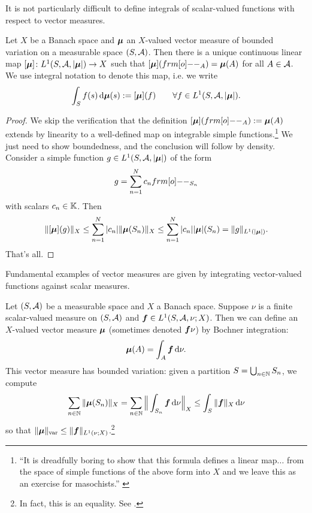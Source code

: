 It is not particularly difficult to define integrals of scalar-valued functions with respect to vector measures.

\begin{prop}
  Let $X$ be a Banach space and $\bm{\mu}$ an $X$-valued vector measure of bounded variation on a measurable space $(S,\mathcal{A})$.
  Then there is a unique continuous linear map $[\bm{\mu}] \colon L^1(S,\mathcal{A},|\bm{\mu}|) \rightarrow X$ such that $[\mb{\mu}](\1_{A}) = \mb{\mu}(A)$ for all $A \in \mathcal{A}$.
  We use integral notation to denote this map, i.e. we write
  \begin{equation*}
    \int_{S} f(s) \, \mathrm{d}\bm{\mu}(s) := [\bm{\mu}](f) \qquad \forall f \in L^1(S,\mathcal{A},|\bm{\mu}|).
  \end{equation*}
\end{prop}

\begin{proof}
  We skip the verification that the definition $[\mb{\mu}](\1_{A}) := \mb{\mu}(A)$ extends by linearity to a well-defined map on integrable simple functions.\footnote{``It is dreadfully boring to show that this formula defines a linear map... from the space of simple functions of the above form into $X$ and we leave this as an exercise for masochists.'' \cite[pp5-6]{DU77}}
  We just need to show boundedness, and the conclusion will follow by density.
  Consider a simple function $g \in L^1(S,\mathcal{A},|\bm{\mu}|)$ of the form
  \begin{equation*}
    g = \sum_{n=1}^{N} c_n \1_{S_n} 
  \end{equation*}
  with scalars $c_n \in \mathbb{K}$.
  Then
  \begin{equation*}
    \begin{aligned}
      \|[\bm{\mu}](g)\|_X \leq \sum_{n=1}^{N} |c_n| \|\bm{\mu}(S_n)\|_X \leq \sum_{n=1}^{N} |c_n| |\bm{\mu}|(S_n) = \|g\|_{L^1(|\bm{\mu}|)}.
    \end{aligned}
  \end{equation*}
  That's all.
\end{proof}

Fundamental examples of vector measures are given by integrating vector-valued functions against scalar measures.

\begin{example}\label{eg:RN-density}
  Let $(S,\mathcal{A})$ be a measurable space and $X$ a Banach space.
  Suppose $\nu$ is a finite scalar-valued measure on $(S,\mathcal{A})$ and $\bm{f} \in L^1(S,\mathcal{A},\nu;X)$.
  Then we can define an $X$-valued vector measure $\bm{\mu}$ (sometimes denoted $\bm{f}\nu$) by Bochner integration:
  \begin{equation*}
    \bm{\mu}(A) = \int_A \bm{f} \, \mathrm{d}\nu.
  \end{equation*}
  This vector measure has bounded variation: given a partition $S = \bigcup_{n \in \mathbb{N}} S_n$, we compute
  \begin{equation*}
    \sum_{n \in \mathbb{N}} \|\bm{\mu}(S_n)\|_{X} = \sum_{n \in \mathbb{N}} \Big\| \int_{S_n} \bm{f} \, \mathrm{d}\nu \Big\|_X
    \leq \int_{S} \|\bm{f}\|_{X} \, \mathrm{d}\nu
  \end{equation*}
  so that $\|\bm{\mu}\|_{\mathrm{var}} \leq \|\bm{f}\|_{L^1(\nu;X)}$.\footnote{In fact, this is an equality. See \cite[pp43]{gP16}.}
\end{example}

